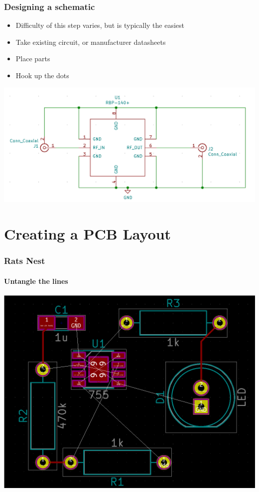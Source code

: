 \documentclass[]{beamer}
\begin{document}
\begin{frame}
    \frametitle{Designing a schematic}
    \begin{itemize}%
        \item{Difficulty of this step varies, but is
            typically the easiest}
        \item{Take existing circuit, or manufacturer
            datasheets}
        \item{Place parts}
        \item{Hook up the dots}
    \end{itemize}
    \includegraphics[keepaspectratio,width=0.75\paperwidth]{images/eeschema.png}
\end{frame}


\section[Layout]{Creating a PCB Layout}
\begin{frame}
    \frametitle{Rats Nest}
    \framesubtitle{Untangle the lines}
    \begin{center}
        \includegraphics[keepaspectratio,height=0.75\paperheight]{images/ratsnest.png}
    \end{center}
\end{frame}
\end{document}
